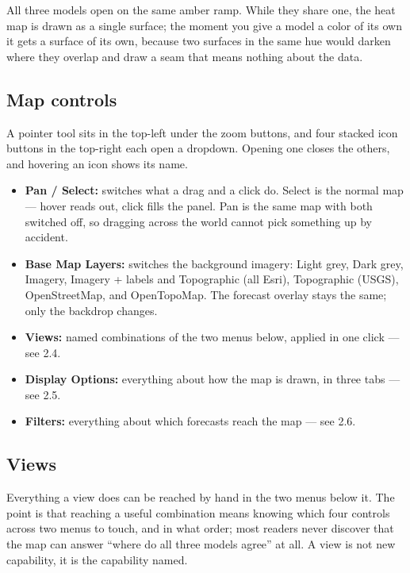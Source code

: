 All three models open on the same amber ramp.
While they share one, the heat map is drawn as a single surface; the moment you give a model a color of its own it gets a surface of its own, because two surfaces in the same hue would darken where they overlap and draw a seam that means nothing about the data.

\subsection{Map controls}\label{map-controls}

A pointer tool sits in the top-left under the zoom buttons, and four stacked icon buttons in the top-right each open a dropdown.
Opening one closes the others, and hovering an icon shows its name.

\begin{itemize}
\item
  \textbf{Pan / Select:} switches what a drag and a click do. Select is the normal map --- hover reads out, click fills the panel. Pan is the same map with both switched off, so dragging across the world cannot pick something up by accident.
\item
  \textbf{Base Map Layers:} switches the background imagery: Light grey, Dark grey, Imagery, Imagery + labels and Topographic (all Esri), Topographic (USGS), OpenStreetMap, and OpenTopoMap. The forecast overlay stays the same; only the backdrop changes.
\item
  \textbf{Views:} named combinations of the two menus below, applied in one click --- see 2.4.
\item
  \textbf{Display Options:} everything about how the map is drawn, in three tabs --- see 2.5.
\item
  \textbf{Filters:} everything about which forecasts reach the map --- see 2.6.
\end{itemize}

\subsection{Views}\label{views}

Everything a view does can be reached by hand in the two menus below it.
The point is that reaching a useful combination means knowing which four controls across two menus to touch, and in what order; most readers never discover that the map can answer ``where do all three models agree'' at all.
A view is not new capability, it is the capability named.

